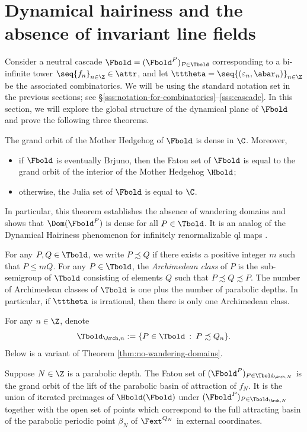 \documentclass{amsart}
\begin{document}
\section{Dynamical hairiness and the absence of invariant line fields}
\label{sec:hairiness-NILF}

Consider a neutral cascade $\Fbold = (\Fbold^P)_{P \in \Tbold}$ corresponding to a bi-infinite tower $\seq{f_n}_{n\in\Z} \in \attr$, and let $\tttheta=\seq{ (\varepsilon_n, \abar_n) }_{n \in \Z}$ be the associated combinatorics.
We will be using the standard notation set in the previous sections; see \S\ref{sss:notation-for-combinatorics}--\ref{sss:cascade}.
In this section, we will explore the global structure of the dynamical plane of $\Fbold$ and prove the following three theorems.

\begin{theorem}
\label{thm:no-wandering-domains}
    The grand orbit of the Mother Hedgehog of $\Fbold$ is dense in $\C$. Moreover,
    \begin{itemize}
        \item if $\Fbold$ is eventually Brjuno, then the Fatou set of $\Fbold$ is equal to the grand orbit of the interior of the Mother Hedgehog $\Hbold$;
        \item otherwise, the Julia set of $\Fbold$ is equal to $\C$.
    \end{itemize}
\end{theorem}

In particular, this theorem establishes the absence of wandering domains and shows that $\Dom(\Fbold^P)$ is dense for all $P \in \Tbold$.
It is an analog of the Dynamical Hairiness phenomenon for infinitely renormalizable ql maps \cite{McM96, Hin00}.

For any $P,Q \in \Tbold$, we write $P \precsim Q$ if there exists a positive integer $m$ such that $P \leq m Q$.
For any $P \in \Tbold$, the \emph{Archimedean class} of $P$ is the sub-semigroup of $\Tbold$ consisting of elements $Q$ such that $P \precsim Q \precsim P$.
The number of Archimedean classes of $\Tbold$ is one plus the number of parabolic depths.
In particular, if $\tttheta$ is irrational, then there is only one Archimedean class.

For any $n \in \Z$, denote
\[
    \Tbold_{\Arch,n} := \{ P \in \Tbold \: : \: P \precsim Q_n \}.
\]
Below is a variant of Theorem \ref{thm:no-wandering-domains}.

\begin{theorem}
\label{thm:parabolic-fatou-set}
    Suppose $N \in \Z$ is a parabolic depth. 
    The Fatou set of $(\Fbold^P)_{P \in \Tbold_{\Arch,N}}$ is the grand orbit of the lift of the parabolic basin of attraction of $f_N$. 
    It is the union of iterated preimages of $\Hbold(\Fbold)$ under $(\Fbold^P)_{P \in \Tbold_{\Arch,N}}$ together with the open set of points which correspond to the full attracting basin of the parabolic periodic point $\beta_N$ of $\Fext^{Q_N}$ in external coordinates.
\end{theorem}
\end{document}
